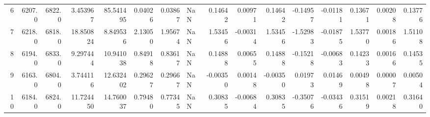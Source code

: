 \begin{longtable}{rrrrrrrlrrrrrrrr}
           6 &          6207.0 &          6822.0 &            3.453967 &             85.541495 &                    0.04026 &                           0.03867 &                                        NaN &                                            0.14642 &                                        0.00971 &                                            0.14642 &                                          -0.14957 &                                           -0.01181 &                 0.13671 &                0.00208 &                   0.13776 \\
           7 &          6218.0 &          6818.0 &           18.850824 &              8.849536 &                    2.13050 &                           1.95674 &                                        NaN &                                            1.53456 &                                       -0.00314 &                                            1.53456 &                                          -1.52983 &                                           -0.01875 &                 1.53770 &                0.00186 &                   1.51108 \\
           8 &          6194.0 &          6833.0 &            9.297444 &             10.941038 &                    0.84918 &                           0.83617 &                                        NaN &                                            0.14888 &                                        0.00655 &                                            0.14888 &                                          -0.15218 &                                           -0.00683 &                 0.14233 &                0.00166 &                   0.14535 \\
           9 &          6163.0 &          6804.0 &            3.744116 &             12.632402 &                    0.29627 &                           0.29667 &                                        NaN &                                           -0.00350 &                                        0.00148 &                                           -0.00350 &                                           0.01973 &                                            0.01469 &                 0.00498 &                0.00007 &                   0.00504 \\
          10 &          6184.0 &          6824.0 &           11.724450 &             14.760037 &                    0.79480 &                           0.77345 &                                        NaN &                                            0.30835 &                                       -0.00684 &                                            0.30835 &                                          -0.35076 &                                           -0.03436 &                 0.31519 &                0.00218 &                   0.31640 \\
\end{longtable}
